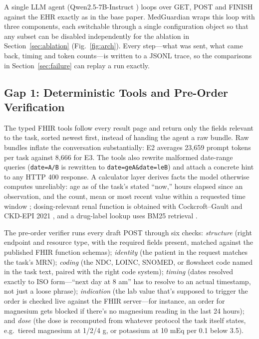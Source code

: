 \documentclass[conference]{IEEEtran}
\begin{document}
A single LLM agent (Qwen2.5-7B-Instruct \cite{qwen2025qwen25}) loops over GET, POST and FINISH against the EHR exactly as in the base paper. MedGuardian wraps this loop with three components, each switchable through a single configuration object so that any subset can be disabled independently for the ablation in Section~\ref{sec:ablation} (Fig.~\ref{fig:arch}). Every step---what was sent, what came back, timing and token counts---is written to a JSONL trace, so the comparisons in Section~\ref{sec:failure} can replay a run exactly.

\subsection{Gap 1: Deterministic Tools and Pre-Order Verification}
The typed FHIR tools follow every result page and return only the fields relevant to the task, sorted newest first, instead of handing the agent a raw bundle. Raw bundles inflate the conversation substantially: E2 averages 23,659 prompt tokens per task against 8,666 for E3. The tools also rewrite malformed date-range queries (\texttt{date=A/B} is rewritten to \texttt{date=geA\&date=leB}) and attach a concrete hint to any HTTP 400 response. A calculator layer derives facts the model otherwise computes unreliably: age as of the task's stated ``now,'' hours elapsed since an observation, and the count, mean or most recent value within a requested time window \cite{goodell2025calculations}; dosing-relevant renal function is obtained with Cockcroft--Gault \cite{cockcroft1976crcl} and CKD-EPI 2021 \cite{inker2021ckdepi}, and a drug-label lookup uses BM25 retrieval \cite{robertson2009bm25}.

The pre-order verifier runs every draft POST through six checks: \emph{structure} (right endpoint and resource type, with the required fields present, matched against the published FHIR function schemas); \emph{identity} (the patient in the request matches the task's MRN); \emph{coding} (the NDC, LOINC, SNOMED, or flowsheet code named in the task text, paired with the right code system); \emph{timing} (dates resolved exactly to ISO form---``next day at 8 am'' has to resolve to an actual timestamp, not just a loose phrase); \emph{indication} (the lab value that's supposed to trigger the order is checked live against the FHIR server---for instance, an order for magnesium gets blocked if there's no magnesium reading in the last 24 hours); and \emph{dose} (the dose is recomputed from whatever protocol the task itself states, e.g.\ tiered magnesium at 1/2/4 g, or potassium at 10 mEq per 0.1 below 3.5).
\end{document}
